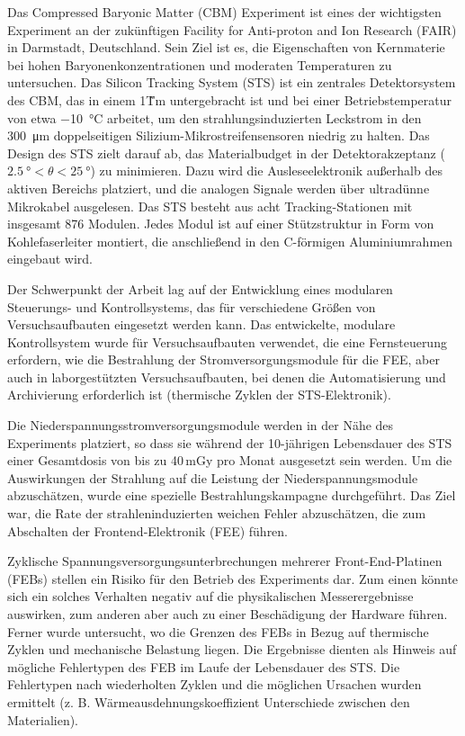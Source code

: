Das Compressed Baryonic Matter (\gls{CBM}) Experiment ist eines der wichtigsten Experiment an der zukünftigen Facility for Anti-proton and Ion Research (FAIR) in Darmstadt, Deutschland. Sein Ziel ist es, die Eigenschaften von Kernmaterie bei hohen Baryonenkonzentrationen und moderaten Temperaturen zu untersuchen. Das Silicon Tracking System (\gls{STS}) ist ein zentrales Detektorsystem des \gls{CBM}, das in einem 1\~Tm untergebracht ist und bei einer Betriebstemperatur von etwa \SI{-10}{\celsius} arbeitet, um den strahlungsinduzierten Leckstrom in den \SI{300}{\micro\metre} doppelseitigen Silizium-Mikrostreifensensoren niedrig zu halten. Das Design des \gls{STS} zielt darauf ab, das Materialbudget in der Detektorakzeptanz ($\SI{2.5}{\degree} < \theta < \SI{25}{\degree}$) zu minimieren. Dazu wird die Ausleseelektronik außerhalb des aktiven Bereichs platziert, und die analogen Signale werden über ultradünne Mikrokabel ausgelesen. Das \gls{STS} besteht aus acht Tracking-Stationen mit  insgesamt 876 Modulen. Jedes Modul ist auf einer Stützstruktur in Form von Kohlefaserleiter montiert, die anschließend in den C-förmigen Aluminiumrahmen eingebaut wird. 

Der Schwerpunkt der Arbeit lag auf der Entwicklung eines modularen Steuerungs- und Kontrollsystems, das für verschiedene Größen von Versuchsaufbauten eingesetzt werden kann. Das entwickelte, modulare Kontrollsystem wurde für Versuchsaufbauten verwendet, die eine Fernsteuerung erfordern, wie die Bestrahlung der Stromversorgungsmodule für die \gls{FEE}, aber auch in laborgestützten Versuchsaufbauten, bei denen die Automatisierung und Archivierung erforderlich ist (thermische Zyklen der \gls{STS}-Elektronik).

Die Niederspannungsstromversorgungsmodule werden in der Nähe des Experiments platziert, so dass sie während der 10-jährigen Lebensdauer des \gls{STS} einer Gesamtdosis von bis zu 40\,mGy pro Monat ausgesetzt sein werden. Um die Auswirkungen der Strahlung auf die Leistung der Niederspannungsmodule abzuschätzen, wurde eine spezielle Bestrahlungskampagne durchgeführt. Das Ziel war, die Rate der strahleninduzierten weichen Fehler abzuschätzen, die zum Abschalten der Frontend-Elektronik (\gls{FEE}) führen.

Zyklische Spannungsversorgungsunterbrechungen mehrerer Front-End-Platinen (\glspl{FEB}) stellen ein Risiko für den Betrieb des Experiments dar. Zum einen könnte sich ein solches Verhalten negativ auf die physikalischen Messerergebnisse auswirken, zum anderen aber auch zu einer Beschädigung der Hardware führen. Ferner wurde untersucht, wo die Grenzen des \glspl{FEB} in Bezug auf thermische Zyklen und mechanische Belastung liegen. Die Ergebnisse dienten als Hinweis auf mögliche Fehlertypen des \gls{FEB} im Laufe der Lebensdauer des \gls{STS}. Die Fehlertypen nach wiederholten Zyklen und die möglichen Ursachen wurden ermittelt (z. B. Wärmeausdehnungskoeffizient Unterschiede zwischen den Materialien). 

